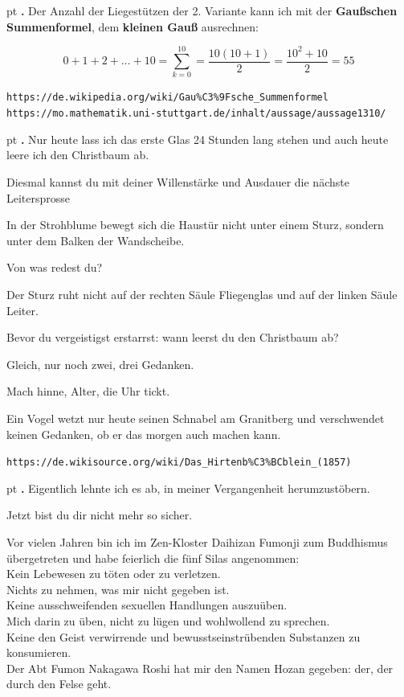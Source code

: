 \documentclass[10pt,a4paper]{article}
\newcounter{notec}
\newcommand\notep[1]{%
  \stepcounter{notec}
  \vskip #1pt
  {\bf\arabic{notec}.}
}
\begin{document}
\begin{mdframed}[style=daystyle]
  \setcounter{notec}{0}
  
  \notep 0 Der Anzahl der Liegestützen der 2. Variante kann ich mit der
         {\bf Gaußschen Summenformel}, dem {\bf kleinen Gauß} ausrechnen:

  \vskip 2pt
  \[ 0 + 1 + 2 + \ldots + 10 = \sum_ {k=0}^{10} = \frac{10 (10 + 1)}{2} =  \frac{10^2 + 10}{2} = 55\]


  \vskip 2pt
  \verb+https://de.wikipedia.org/wiki/Gau%C3%9Fsche_Summenformel+ \\
  \verb+https://mo.mathematik.uni-stuttgart.de/inhalt/aussage/aussage1310/+
  \vskip 2pt
  
  \notep 4 Nur heute lass ich das erste Glas 24 Stunden lang stehen und auch
  heute leere ich den Christbaum ab.
  
  \vskip 2pt
  Diesmal kannst du mit deiner Willenstärke und Ausdauer die nächste
  Leitersprosse
  
  \vskip 2pt
  In der Strohblume bewegt sich die Haustür nicht unter einem Sturz, sondern
  unter dem Balken der Wandscheibe.
  
  \vskip 2pt
  Von was redest du?
  
  \vskip 2pt
  Der Sturz ruht nicht auf der rechten Säule Fliegenglas und auf der linken
  Säule Leiter.
  
  \vskip 2pt
  Bevor du vergeistigst erstarrst: wann leerst du den Christbaum ab?
  
  \vskip 2pt
  Gleich, nur noch zwei, drei Gedanken.
  
  \vskip 2pt
  Mach hinne, Alter, die Uhr tickt.
  
  \vskip 2pt
  Ein Vogel wetzt nur heute seinen Schnabel am Granitberg und verschwendet
  keinen Gedanken, ob er das morgen auch machen kann.
  
  \vskip 2pt
  \verb+https://de.wikisource.org/wiki/Das_Hirtenb%C3%BCblein_(1857)+
  
  \notep 4 Eigentlich lehnte ich es ab, in meiner Vergangenheit herumzustöbern.
  
  \vskip 2pt
  Jetzt bist du dir nicht mehr so sicher.
  
  \vskip 2pt
  Vor vielen Jahren bin ich im Zen-Kloster Daihizan Fumonji zum Buddhismus
  übergetreten und habe feierlich die fünf Silas angenommen: \\
  Kein Lebewesen zu töten oder zu verletzen. \\
  Nichts zu nehmen, was mir nicht gegeben ist. \\
  Keine ausschweifenden sexuellen Handlungen auszuüben. \\
  Mich darin zu üben, nicht zu lügen und wohlwollend zu sprechen. \\
  Keine den Geist verwirrende und bewusstseinstrübenden Substanzen zu
  konsumieren. \\
  Der Abt Fumon Nakagawa Roshi hat mir den Namen Hozan gegeben: der, der durch
  den Felse geht.
  

\end{mdframed}
\end{document}
